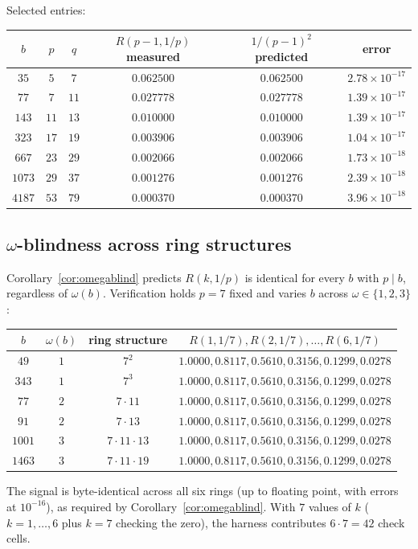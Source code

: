 \documentclass[11pt,reqno]{amsart}
\theoremstyle{plain}
\theoremstyle{definition}
\theoremstyle{remark}
\begin{document}
Selected entries:
\begin{center}
\begin{tabular}{c|c|c|c|c|c}
\toprule
$b$ & $p$ & $q$ & $R(p-1, 1/p)$ measured & $1/(p-1)^2$ predicted & error \\
\midrule
$35$   & $5$  & $7$  & $0.062500$ & $0.062500$ & $2.78 \times 10^{-17}$ \\
$77$   & $7$  & $11$ & $0.027778$ & $0.027778$ & $1.39 \times 10^{-17}$ \\
$143$  & $11$ & $13$ & $0.010000$ & $0.010000$ & $1.39 \times 10^{-17}$ \\
$323$  & $17$ & $19$ & $0.003906$ & $0.003906$ & $1.04 \times 10^{-17}$ \\
$667$  & $23$ & $29$ & $0.002066$ & $0.002066$ & $1.73 \times 10^{-18}$ \\
$1073$ & $29$ & $37$ & $0.001276$ & $0.001276$ & $2.39 \times 10^{-18}$ \\
$4187$ & $53$ & $79$ & $0.000370$ & $0.000370$ & $3.96 \times 10^{-18}$ \\
\bottomrule
\end{tabular}
\end{center}

\subsection{$\omega$-blindness across ring structures}

Corollary~\ref{cor:omegablind} predicts $R(k, 1/p)$ is identical
for every $b$ with $p \mid b$, regardless of $\omega(b)$.
Verification holds $p = 7$ fixed and varies $b$ across
$\omega \in \{1, 2, 3\}$:
\begin{center}
\begin{tabular}{c|c|c|c}
\toprule
$b$    & $\omega(b)$ & ring structure         & $R(1, 1/7), R(2, 1/7), \ldots, R(6, 1/7)$ \\
\midrule
$49$   & $1$ & $7^2$        & $1.0000, 0.8117, 0.5610, 0.3156, 0.1299, 0.0278$ \\
$343$  & $1$ & $7^3$        & $1.0000, 0.8117, 0.5610, 0.3156, 0.1299, 0.0278$ \\
$77$   & $2$ & $7 \cdot 11$ & $1.0000, 0.8117, 0.5610, 0.3156, 0.1299, 0.0278$ \\
$91$   & $2$ & $7 \cdot 13$ & $1.0000, 0.8117, 0.5610, 0.3156, 0.1299, 0.0278$ \\
$1001$ & $3$ & $7 \cdot 11 \cdot 13$ & $1.0000, 0.8117, 0.5610, 0.3156, 0.1299, 0.0278$ \\
$1463$ & $3$ & $7 \cdot 11 \cdot 19$ & $1.0000, 0.8117, 0.5610, 0.3156, 0.1299, 0.0278$ \\
\bottomrule
\end{tabular}
\end{center}
The signal is byte-identical across all six rings (up to floating
point, with errors at $10^{-16}$), as required by
Corollary~\ref{cor:omegablind}. With $7$ values of $k$
($k = 1, \ldots, 6$ plus $k = 7$ checking the zero), the harness
contributes $6 \cdot 7 = 42$ check cells.
\end{document}
